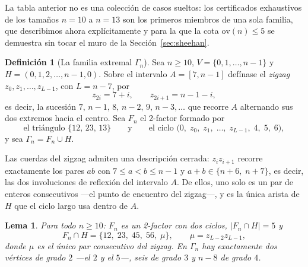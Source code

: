 \documentclass[11pt,a4paper]{article}
\newtheorem{lema}[teorema]{Lema}
\theoremstyle{definition}
\newtheorem{definicion}[teorema]{Definición}
\theoremstyle{remark}
\begin{document}
La tabla anterior no es una colección de casos sueltos: los certificados exhaustivos de los tamaños $n=10$ a $n=13$ son los primeros miembros de una sola familia, que describimos ahora explícitamente y para la que la cota $\mathrm{ov}(n)\le5$ se demuestra sin tocar el muro de la Sección~\ref{sec:sheehan}.

\begin{definicion}[La familia extremal $\Gamma_n$]\label{def:gamma}
Sea $n\ge10$, $V=\{0,1,\dots,n-1\}$ y $H=(0,1,2,\dots,n-1,0)$. Sobre el intervalo $A=[7,n-1]$ defínase el \emph{zigzag} $z_0,z_1,\dots,z_{L-1}$, con $L=n-7$, por
\[
z_{2i}=7+i,\qquad z_{2i+1}=n-1-i ,
\]
es decir, la sucesión $7,\,n-1,\,8,\,n-2,\,9,\,n-3,\dots$ que recorre $A$ alternando sus dos extremos hacia el centro. Sea $F_n$ el 2-factor formado por
\[
\text{el triángulo } \{12,\,23,\,13\}
\qquad\text{y}\qquad
\text{el ciclo } \bigl(0,\;z_0,\;z_1,\;\dots,\;z_{L-1},\;4,\;5,\;6\bigr),
\]
y sea $\Gamma_n=F_n\cup H$.
\end{definicion}

Las cuerdas del zigzag admiten una descripción cerrada: $z_iz_{i+1}$ recorre exactamente los pares $ab$ con $7\le a<b\le n-1$ y $a+b\in\{n+6,\;n+7\}$, es decir, las dos involuciones de reflexión del intervalo $A$. De ellos, uno solo es un par de enteros consecutivos —el punto de encuentro del zigzag—, y es la única arista de $H$ que el ciclo largo usa dentro de $A$.

\begin{lema}\label{lem:gammabasico}
Para todo $n\ge10$: $F_n$ es un 2-factor con dos ciclos, $|F_n\cap H|=5$ y
\[
F_n\cap H=\{12,\;23,\;45,\;56,\;\mu\},\qquad \mu=z_{L-2}z_{L-1},
\]
donde $\mu$ es el único par consecutivo del zigzag. En $\Gamma_n$ hay exactamente dos vértices de grado $2$ —el $2$ y el $5$—, seis de grado $3$ y $n-8$ de grado $4$.
\end{lema}
\end{document}
